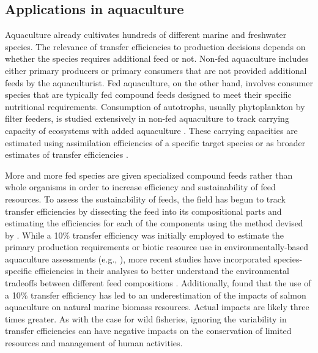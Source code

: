 \documentclass[oneside,12pt,final]{sty/ucthesis-CA2012}
\let\cite\citep                             %
\begin{document}
\begin{mainmatter}
\subsection*{Applications in aquaculture}
Aquaculture already cultivates hundreds of different marine and freshwater species. The relevance of transfer efficiencies to production decisions depends on whether the species requires additional feed or not. Non-fed aquaculture includes either primary producers or primary consumers that are not provided additional feeds by the aquaculturist. Fed aquaculture, on the other hand, involves consumer species that are typically fed compound feeds designed to meet their specific nutritional requirements. Consumption of autotrophs, usually phytoplankton by filter feeders, is studied extensively in non-fed aquaculture to track carrying capacity of ecosystems with added aquaculture \cite{banas2007tidal}. These carrying capacities are estimated using assimilation efficiencies of a specific target species \cite{rosland2009applying, irisarri2013absorption, srisunont2016estimating} or as broader estimates of transfer efficiencies \cite{simenstad1995influence, sommer1998algal, byron2011calculating, han2017evaluating}.

\vspace{5mm}

More and more fed species are given specialized compound feeds rather than whole organisms in order to increase efficiency and sustainability of feed resources. To assess the sustainability of feeds, the field has begun to track transfer efficiencies by dissecting the feed into its compositional parts and estimating the efficiencies for each of the components using the method devised by \citet{pauly1995primary}. While a 10\% transfer efficiency was initially employed to estimate the primary production requirements or biotic resource use in environmentally-based aquaculture assessments (e.g., \citealt{papatryphon2004environmental, pelletier2007feeding, pelletier2009not}), more recent studies have incorporated species-specific efficiencies in their analyses to better understand the environmental tradeoffs between different feed compositions \cite{cashion2016review}. Additionally, \citet{cashion2016review} found that the use of a 10\% transfer efficiency has led to an underestimation of the impacts of salmon aquaculture on natural marine biomass resources. Actual impacts are likely three times greater. As with the case for wild fisheries, ignoring the variability in transfer efficiencies can have negative impacts on the conservation of limited resources and management of human activities.


\end{mainmatter}
\end{document}
